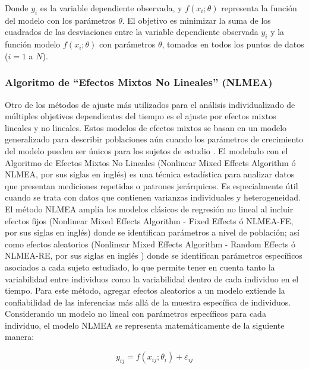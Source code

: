 Donde $y_i$ es la variable dependiente observada, y $f(x_i; \theta)$ representa la función del modelo con los parámetros $\theta$. El objetivo es minimizar la suma de los cuadrados de las desviaciones entre la variable dependiente observada $y_i$ y la función modelo $f(x_i; \theta)$ con parámetros $\theta$, tomados en todos los puntos de datos ($i = 1$ a $N$).

\subsubsection{Algoritmo de ``Efectos Mixtos No Lineales'' (NLMEA)}\label{NLMEAlabel}

Otro de los métodos de ajuste más utilizados para el análisis individualizado de múltiples objetivos dependientes del tiempo es el ajuste por efectos mixtos lineales y no lineales. Estos modelos de efectos mixtos se basan en un modelo generalizado para describir poblaciones aún cuando los parámetros de crecimiento del modelo pueden ser únicos para los sujetos de estudio \cite{mixedShelley}. El modelado con el Algoritmo de Efectos Mixtos No Lineales (Nonlinear Mixed Effects Algorithm ó NLMEA, por sus siglas en inglés) es una técnica estadística para analizar datos que presentan mediciones repetidas o patrones jerárquicos. Es especialmente útil cuando se trata con datos que contienen varianzas individuales y heterogeneidad. El método NLMEA amplía los modelos clásicos de regresión no lineal al incluir efectos fijos (Nonlinear Mixed Effects Algorithm - Fixed Effects ó NLMEA-FE, por sus siglas en inglés) donde se identifican parámetros a nivel de población; así como efectos aleatorios (Nonlinear Mixed Effects Algorithm - Random Effects ó NLMEA-RE, por sus siglas en inglés ) donde se identifican parámetros específicos asociados a cada sujeto estudiado, lo que permite tener en cuenta tanto la variabilidad entre individuos como la variabilidad dentro de cada individuo en el tiempo. Para este método, agregar efectos aleatorios a un modelo extiende la confiabilidad de las inferencias más allá de la muestra específica de individuos.\\

Considerando un modelo no lineal con parámetros específicos para cada individuo, el modelo NLMEA se representa matemáticamente de la siguiente manera:

\begin{equation}
y_{ij} = f(x_{ij}; \theta_i) + \varepsilon_{ij}    
\end{equation}

